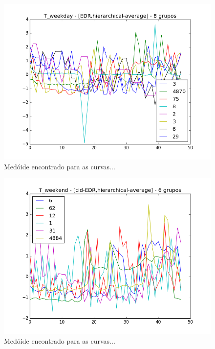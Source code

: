 \begin{figure}[h!]
	\includegraphics[width=\linewidth]{figuras/irish/2016-07-19_15:33:04.743952__irish_results/T_weekday_-_[EDR,hierarchical-average]_-_8_grupos.png}
	\caption{Medóide encontrado para as curvas...}
\end{figure}

\begin{figure}[h!]
	\includegraphics[width=\linewidth]{figuras/irish/2016-07-19_15:33:04.743952__irish_results/T_weekend_-_[cid-EDR,hierarchical-average]_-_6_grupos.png}
	\caption{Medóide encontrado para as curvas...}
\end{figure}


